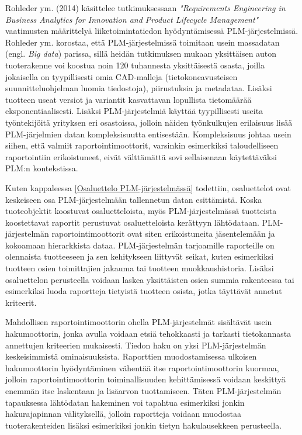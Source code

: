 Rohleder ym. (2014) käsittelee tutkimuksessaan \textit{"Requirements Engineering in Business Analytics for Innovation and Product Lifecycle Management"} vaatimusten määrittelyä liiketoimintatiedon hyödyntämisessä PLM-järjestelmissä. Rohleder ym. korostaa, että PLM-järjestelmissä toimitaan usein massadatan (engl. \textit{Big data})  parissa, sillä heidän tutkimuksen mukaan yksittäisen auton tuoterakenne voi koostua noin 120 tuhannesta yksittäisestä osasta, joilla jokaisella on tyypillisesti omia CAD-malleja (tietokoneavusteisen suunnitteluohjelman luomia tiedostoja), piirustuksia ja metadataa. Lisäksi tuotteen useat versiot ja variantit kasvattavan lopullista tietomäärää eksponentiaalisesti. Lisäksi PLM-järjestelmiä käyttää tyypillisesti useita työntekijöitä yrityksen eri osastoissa, jolloin näiden työnkulkujen erilaisuus lisää PLM-järjelmien datan kompleksisuutta entisestään. Kompleksisuus johtaa usein siihen, että valmiit raportointimoottorit, varsinkin esimerkiksi taloudelliseen raportointiin erikoistuneet, eivät välttämättä sovi sellaisenaan käytettäväksi PLM:n kontekstissa. \cite{rohleder_requirements_2014}

Kuten kappaleessa \ref{Osaluettelo PLM-järjestelmässä} todettiin, osaluettelot ovat keskeiseen osa PLM-järjestelmään tallennetun datan esittämistä. Koska tuoteobjektit koostuvat osaluetteloista, myös PLM-järjestelmässä tuotteista koostettavat raportit perustuvat osaluetteloista kerättyyn lähtödataan. PLM-järjestelmän raportointimoottorit ovat siten erikoistuneita jäsentelemään ja kokoamaan hierarkkista dataa. \cite{rohleder_requirements_2014} PLM-järjestelmän tarjoamille raporteille on olennaista tuotteeseen ja sen kehitykseen liittyvät seikat, kuten esimerkiksi tuotteen osien toimittajien jakauma tai tuotteen muokkaushistoria. Lisäksi osaluettelon perusteella voidaan laskea yksittäisten osien summia rakenteessa tai esimerkiksi luoda raportteja tietyistä tuotteen osista, jotka täyttävät annetut kriteerit.

Mahdollisen raportointimoottorin ohella PLM-järjestelmät sisältävät usein hakumoottorin, jonka avulla voidaan etsiä tehokkaasti ja tarkasti tietokannasta annettujen kriteerien mukaisesti. Tiedon haku on yksi PLM-järjestelmän keskeisimmistä ominaisuuksista. \cite{enriquez_approach_2019} Raporttien muodostamisessa ulkoisen hakumoottorin hyödyntäminen vähentää itse raportointimoottorin kuormaa, jolloin raportointimoottorin toiminallisuuden kehittämisessä voidaan keskittyä enemmän itse laskentaan ja lisäarvon tuottamiseen. Täten PLM-järjestelmän tapauksessa lähtödatan hakeminen voi tapahtua esimerkiksi jonkin hakurajapinnan välityksellä, jolloin raportteja voidaan muodostaa tuoterakenteiden lisäksi esimerkiksi jonkin tietyn hakulausekkeen perusteella.

